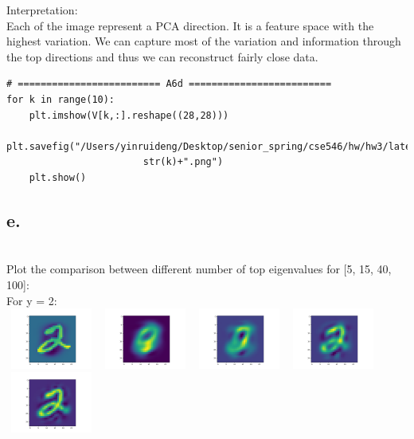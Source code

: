 \documentclass{article}
\begin{document}
Interpretation: \\
Each of the image represent a PCA direction. It is a feature space with the highest variation. We can capture most of the variation and information through the top directions and thus we can reconstruct fairly close data. 

\begin{verbatim}
# ========================= A6d =========================
for k in range(10):
	plt.imshow(V[k,:].reshape((28,28)))
	plt.savefig("/Users/yinruideng/Desktop/senior_spring/cse546/hw/hw3/latex/plots/A6d/A6d_"+
						str(k)+".png")
	plt.show()

\end{verbatim}
\subsection*{e.}
 \\
Plot the comparison between different number of top eigenvalues for [5, 15, 40, 100]:\\
For y = 2: \\
\includegraphics[width=3cm, height=2cm]{plots/A6e/A6e_5.png}
\includegraphics[width=3cm, height=2cm]{plots/A6e/A6e_5_5.png}
\includegraphics[width=3cm, height=2cm]{plots/A6e/A6e_5_15.png}
\includegraphics[width=3cm, height=2cm]{plots/A6e/A6e_5_40.png}
\includegraphics[width=3cm, height=2cm]{plots/A6e/A6e_5_100.png} \\
\end{document}
